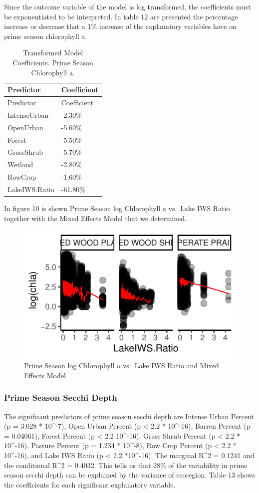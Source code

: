 \documentclass[12pt,]{article}
\begin{document}
Since the outcome variable of the model is log transformed, the
coefficients must be exponentiated to be interpreted. In table 12 are
presented the percentage increase or decrease that a 1\% increase of the
explanatory variables have on prime season chlorophyll a.

\begin{longtable}[]{@{}ll@{}}
\caption{Transformed Model Coefficients. Prime Season Chlorophyll
a.}\tabularnewline
\toprule
Predictor & Coefficient\tabularnewline
\midrule
\endfirsthead
\toprule
Predictor & Coefficient\tabularnewline
\midrule
\endhead
IntenseUrban & -2.30\%\tabularnewline
OpenUrban & -5.60\%\tabularnewline
Forest & -5.50\%\tabularnewline
GrassShrub & -5.70\%\tabularnewline
Wetland & -2.80\%\tabularnewline
RowCrop & -1.60\%\tabularnewline
LakeIWS.Ratio & -61.80\%\tabularnewline
\bottomrule
\end{longtable}

In figure 10 is shown Prime Season log Chlorophyll a vs.~Lake IWS Ratio
together with the Mixed Effects Model that we determined.

\begin{figure}
\centering
\includegraphics{Bollt_Greif_Raby_Roth_Project_Final_files/figure-latex/unnamed-chunk-25-1.pdf}
\caption{Prime Season log Chlorophyll a vs.~Lake IWS Ratio and Mixed
Effects Model}
\end{figure}

\hypertarget{prime-season-secchi-depth}{%
\subsubsection{Prime Season Secchi
Depth}\label{prime-season-secchi-depth}}

The significant predictors of prime season secchi depth are Intense
Urban Percent (p = 3.028 * 10\^{}-7), Open Urban Percent (p \textless{}
2.2 * 10\^{}-16), Barren Percent (p = 0.04061), Forest Percent (p
\textless{} 2.2 10\^{}-16), Grass Shrub Percent (p \textless{} 2.2 *
10\^{}-16), Pasture Percent (p = 1.234 * 10\^{}-8), Row Crop Percent (p
\textless{} 2.2 * 10\^{}-16), and Lake IWS Ratio (p \textless{} 2.2
*10\^{}-16). The marginal R\^{}2 = 0.1241 and the conditional R\^{}2 =
0.4032. This tells us that 28\% of the variability in prime season
secchi depth can be explained by the variance of ecoregion. Table 13
shows the coefficients for each significant explanatory variable.
\end{document}
